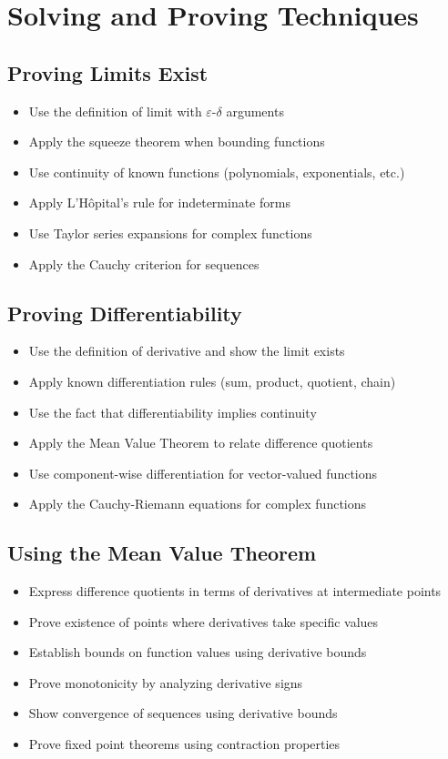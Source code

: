 \section{Solving and Proving Techniques}

\subsection*{Proving Limits Exist}
\begin{itemize}
\item Use the definition of limit with $\varepsilon$-$\delta$ arguments
\item Apply the squeeze theorem when bounding functions
\item Use continuity of known functions (polynomials, exponentials, etc.)
\item Apply L'Hôpital's rule for indeterminate forms
\item Use Taylor series expansions for complex functions
\item Apply the Cauchy criterion for sequences
\end{itemize}

\subsection*{Proving Differentiability}
\begin{itemize}
\item Use the definition of derivative and show the limit exists
\item Apply known differentiation rules (sum, product, quotient, chain)
\item Use the fact that differentiability implies continuity
\item Apply the Mean Value Theorem to relate difference quotients
\item Use component-wise differentiation for vector-valued functions
\item Apply the Cauchy-Riemann equations for complex functions
\end{itemize}

\subsection*{Using the Mean Value Theorem}
\begin{itemize}
\item Express difference quotients in terms of derivatives at intermediate points
\item Prove existence of points where derivatives take specific values
\item Establish bounds on function values using derivative bounds
\item Prove monotonicity by analyzing derivative signs
\item Show convergence of sequences using derivative bounds
\item Prove fixed point theorems using contraction properties
\end{itemize}

